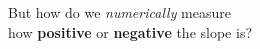 \documentclass[preview]{standalone}
\begin{document}
\begin{center}
But how do we \textit{numerically} measure\\ how \textbf{positive} or \textbf{negative} the slope is?
\end{center}
\end{document}
